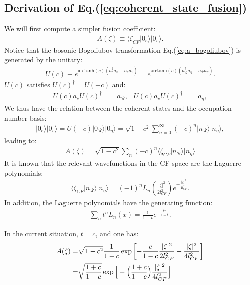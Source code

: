\begin{subappendices}
\section{Derivation of Eq.(\ref{eq:coherent_state_fusion})}\label{app:coherent_state_fusion}
We will first compute a simpler fusion coefficient:
\begin{align}
A(\zeta)\equiv\langle\zeta_{CF}| 0_e\rangle|0_v\rangle.
\end{align}
Notice that the bosonic Bogoliubov transformation Eq.(\ref{eq:a_bogoliubov}) is generated by the unitary:
\begin{align}
U(c)\equiv e^{\text{arctanh}(c) (a_e^\dagger a_v^\dagger-a_ea_v)}=e^{\text{arctanh}(c) (a_{\mathcal R}^\dagger a_{\eta}^\dagger-a_{\mathcal R}a_{\eta})}.
\end{align}
$U(c)$ satisfies $U(c)^\dagger=U(-c)$ and:
\begin{align}
U(c) a_e U(c)^\dagger&=a_{\mathcal R},&U(c) a_v U(c)^\dagger&=a_{\eta},
\end{align}
We thus have the relation between the coherent states and the occupation number basis:
\begin{align}
|0_e\rangle|0_v\rangle=U(-c)|0_{\mathcal R}\rangle|0_\eta\rangle=\sqrt{1-c^2}\sum_{n=0}^{\infty} (-c)^n|n_{\mathcal R}\rangle|n_\eta\rangle,
\end{align}
leading to:
\begin{align}
A(\zeta)=\sqrt{1-c^2}\sum_n (-c)^n\langle\zeta_{CF}| n_{\mathcal R}\rangle|n_{\eta}\rangle
\end{align}
It is known that the relevant wavefunctions in the CF space are the Laguerre polynomials:
\begin{align}
\langle\zeta_{CF}| n_{\mathcal R}\rangle|n_{\eta}\rangle=(-1)^nL_n\left(\frac{|\zeta|^2}{2l_{CF}^2}\right) e^{-\frac{|\zeta|^2}{4l_{CF}^2}}.
\end{align}
In addition, the Laguerre polynomials have the generating function:
\begin{align}
\sum_n t^n L_n(x)=\frac{1}{1-t}e^{-\frac{tx}{1-t}}.
\end{align}

In the current situation, $t=c$, and one has:
\begin{align}
A(\zeta)=&\sqrt{1-c^2}\frac{1}{1-c} \exp\left[-\frac{c}{1-c}\frac{|\zeta|^2}{2l_{CF}^2}-\frac{|\zeta|^2}{4l_{CF}^2}\right]\notag\\
=&\sqrt{\frac{1+c}{1-c}}\exp\Big[-\Big(\frac{1+c}{1-c}\Big)\frac{|\zeta|^2}{4l_{CF}^2}\Big]
\end{align}


\end{subappendices}
